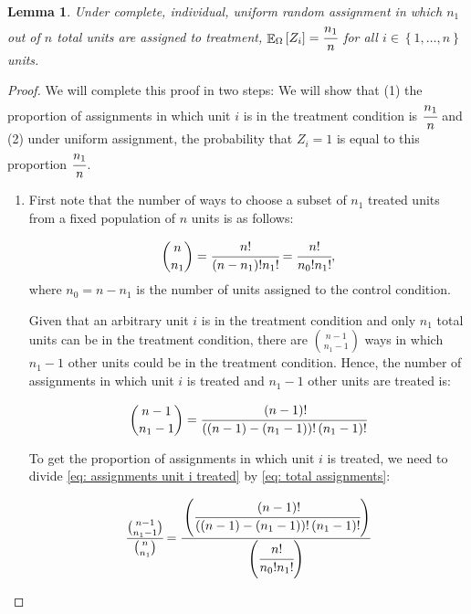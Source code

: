 \documentclass[12pt,leqno]{article}
\theoremstyle{newstyle}
\newtheorem{lem}{Lemma}
\DeclareMathOperator{\E}{\mathbb{E}}
\begin{document}
\begin{lem} \label{lem: exp val Z}
Under complete, individual, uniform random assignment in which $n_1$ out of $n$ total units are assigned to treatment, $\E_{\Omega}\left[Z_i\right] = \cfrac{n_1}{n}$ for all $i \in \left\{1, \dots , n\right\}$ units.
\end{lem}
\begin{proof}

We will complete this proof in two steps: We will show that (1) the proportion of assignments in which unit $i$ is in the treatment condition is $\cfrac{n_1}{n}$ and (2) under uniform assignment, the probability that $Z_i = 1$ is equal to this proportion $\cfrac{n_1}{n}$.

\begin{enumerate}

\item First note that the number of ways to choose a subset of $n_1$ treated units from a fixed population of $n$ units is as follows:

\begin{equation} \label{eq: total assignments}
\binom{n}{n_1} = \cfrac{n!}{\left(n - n_1\right)!n_1!} = \cfrac{n!}{n_0!n_1!},
\end{equation}
where $n_0 = n - n_1$ is the number of units assigned to the control condition.

Given that an arbitrary unit $i$ is in the treatment condition and only $n_1$ total units can be in the treatment condition, there are $\binom{n - 1}{n_1 - 1}$ ways in which $n_1 - 1$ other units could be in the treatment condition. Hence, the number of assignments in which unit $i$ is treated and $n_1 - 1$ other units are treated is:

\begin{equation} \label{eq: assignments unit i treated}
\binom{n - 1}{n_1 - 1} = \cfrac{\left(n - 1\right)!}{\left(\left(n - 1\right) - \left(n_1 - 1\right)\right)!\left(n_1 - 1\right)!}
\end{equation}

To get the proportion of assignments in which unit $i$ is treated, we need to divide \eqref{eq: assignments unit i treated} by \eqref{eq: total assignments}:

\begin{equation} \label{eq: prop assignments unit i treated I}
\cfrac{\binom{n - 1}{n_1 - 1}}{\binom{n}{n_1}} = \cfrac{\left(\cfrac{\left(n - 1\right)!}{\left(\left(n - 1\right) - \left(n_1 - 1\right)\right)!\left(n_1 - 1\right)!}\right)}{\left(\cfrac{n!}{n_0!n_1!}\right)}
\end{equation}


\end{enumerate}
\end{proof}
\end{document}

